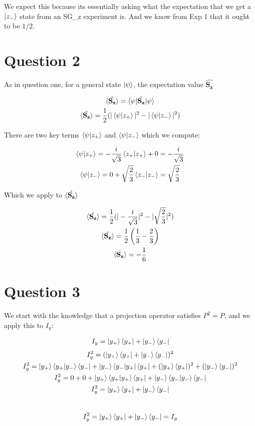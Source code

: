 \documentclass{article}
\let\oldhat\hat
\renewcommand{\hat}[1]{\oldhat{\mathbf{#1}}}
\begin{document}
    We expect this because its essentially asking what the expectation that we get a $\ket{z_-}$ state
    from an SG\_z experiment is. And we know from Exp 1 that it ought to be $1/2$.


\section{Question 2}

    As in question one, for a general state $\ket{\psi}$, the expectation value $\hat{S_z}$

    \begin{gather}
        \braket{\hat{S_z}} = \braket{\psi|\hat{S_z}|\psi}\\
        \braket{\hat{S_z}} = \frac{1}{2}(|\braket{\psi|z_+}|^2 - |\braket{\psi|z_-}|^2)
    \end{gather}

    There are two key terms $\braket{\psi|z_+}$ and $\braket{\psi|z_-}$ which we compute:

    \begin{gather}
        \braket{\psi|z_+} = -\frac{i}{\sqrt{3}}\braket{z_+|z_+} + 0 = -\frac{i}{\sqrt{3}}\\
        \braket{\psi|z_-} = 0 + \sqrt{\frac{2}{3}}\braket{z_-|z_-} = \sqrt{\frac{2}{3}}
    \end{gather}

    Which we apply to $\braket{\hat{S_z}}$

    \begin{gather}
        \braket{\hat{S_z}} = \frac{1}{2}(|-\frac{i}{\sqrt{3}}|^2 - |\sqrt{\frac{2}{3}}|^2)\\
        \braket{\hat{S_z}} = \frac{1}{2}\left( \frac{1}{3} - \frac{2}{3} \right)\\
        \braket{\hat{S_z}} = -\frac{1}{6}
    \end{gather}



\section{Question 3}

    We start with the knowledge that a projection operator satisfies $P^2 = P$,
    and we apply this to $I_y$:

    \begin{gather}
        I_y = \ket{y_+}\bra{y_+} + \ket{y_-}\bra{y_-}
    \end{gather}
    \begin{gather*}
        I_y^2 = (\ket{y_+}\bra{y_+} + \ket{y_-}\bra{y_-})^2\\
        I_y^2 = \ket{y_+}\braket{y_+|y_-}\bra{y_-} + \ket{y_-}\bra{y_-|y_+}\bra{y_+}
        + (\ket{y_+}\bra{y_+})^2 + (\ket{y_-}\bra{y_-})^2\\
        I_y^2 = 0 + 0 + \ket{y_+}\braket{y_+|y_+}\bra{y_+} + \ket{y_-}\braket{y_-|y_-}\bra{y_-}\\
        I_y^2 = \ket{y_+}\bra{y_+} + \ket{y_-}\bra{y_-}
    \end{gather*}\
    \begin{gather*}
        I_y^2 = \ket{y_+}\bra{y_+} + \ket{y_-}\bra{y_-} = I_y
    \end{gather*}
\end{document}
